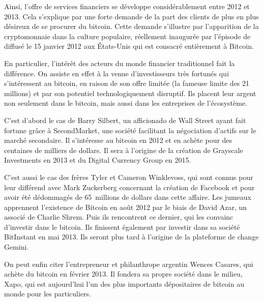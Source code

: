 Ainsi, l'offre de services financiers se développe considérablement entre 2012 et 2013. Cela s'explique par une forte demande de la part des clients de plus en plus désireux de se procurer du bitcoin. Cette demande s'illustre par l'apparition de la cryptomonnaie dans la culture populaire, réellement inaugurée par l'épisode de  diffusé le 15 janvier 2012 aux États-Unis qui est consacré entièrement à Bitcoin.


En particulier, l'intérêt des acteurs du monde financier traditionnel fait la différence. On assiste en effet à la venue d'investisseurs très fortunés qui s'intéressent au bitcoin, en raison de son offre limitée (la fameuse limite des 21 millions) et par son potentiel technologiquement disruptif. Ils placent leur argent non seulement dans le bitcoin, mais aussi dans les entreprises de l'écosystème.

C'est d'abord le cas de Barry Silbert, un afficionado de Wall Street ayant fait fortune grâce à SecondMarket, une société facilitant la négociation d'actifs sur le marché secondaire. Il s'intéresse au bitcoin en 2012 et en achète pour des centaines de milliers de dollars. Il sera à l'origine de la création de Grayscale Investments en 2013 et du Digital Currency Group en 2015.

C'est aussi le cas des frères Tyler et Cameron Winklevoss, qui sont connus pour leur différend avec Mark Zuckerberg concernant la création de Facebook et pour avoir été dédommagés de 65~millions de dollars dans cette affaire. Les jumeaux apprennent l'existence de Bitcoin en août 2012 par le biais de David Azar, un associé de Charlie Shrem. Puis ils rencontrent ce dernier, qui les convainc d'investir dans le bitcoin. Ils finissent également par investir dans sa société BitInstant en mai 2013. Ils seront plus tard à l'origine de la plateforme de change Gemini.

On peut enfin citer l'entrepreneur et philanthrope argentin Wences Casares, qui achète du bitcoin en février 2013. Il fondera sa propre société dans le milieu, Xapo, qui est aujourd'hui l'un des plus importants dépositaires de bitcoin au monde pour les particuliers.

